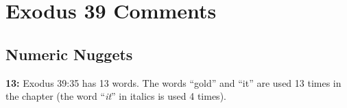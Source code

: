 \section{Exodus 39 Comments}

\subsection{Numeric Nuggets}
\textbf{13: } Exodus 39:35 has 13 words. The words ``gold'' and ``it'' are used 13 times in the chapter (the word ``\emph{it}'' in italics is used 4 times).

